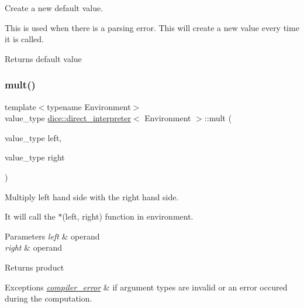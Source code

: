 Create a new default value. 

This is used when there is a parsing error. This will create a new value every time it is called.

\begin{DoxyReturn}{Returns}
default value 
\end{DoxyReturn}
\mbox{\label{classdice_1_1direct__interpreter_a147528647247f61f2f2fdf3fc7423cf7}} 
\subsubsection{\texorpdfstring{mult()}{mult()}}
{\footnotesize\ttfamily template$<$typename Environment$>$ \\
value\+\_\+type \mbox{\hyperlink{classdice_1_1direct__interpreter}{dice\+::direct\+\_\+interpreter}}$<$ Environment $>$\+::mult (\begin{DoxyParamCaption}\item[{value\+\_\+type}]{left,  }\item[{value\+\_\+type}]{right }\end{DoxyParamCaption})\hspace{0.3cm}{\ttfamily [inline]}}



Multiply left hand side with the right hand side. 

It will call the $\ast$(left, right) function in environment.


\begin{DoxyParams}{Parameters}
{\em left} & operand \\
\hline
{\em right} & operand\\
\hline
\end{DoxyParams}
\begin{DoxyReturn}{Returns}
product
\end{DoxyReturn}

\begin{DoxyExceptions}{Exceptions}
{\em \mbox{\hyperlink{classdice_1_1compiler__error}{compiler\+\_\+error}}} & if argument types are invalid or an error occured during the computation. \\
\hline
\end{DoxyExceptions}
\mbox{\label{classdice_1_1direct__interpreter_a1ec4254bbc04f2893f27dba411102633}} 
